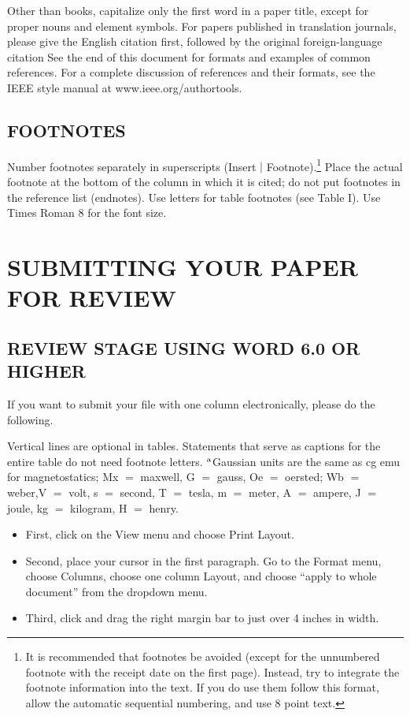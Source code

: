 \documentclass{IEEEojcsys}
\begin{document}
Other than books, capitalize only the first word in a paper title, except for proper nouns and element symbols. For papers published in translation journals, please give the English citation first, followed by the original foreign-language citation See the end of this document for formats and examples of common references. For a complete discussion of references and their formats, see the IEEE style manual at www.ieee.org/authortools.

\subsection{FOOTNOTES}

Number footnotes separately in superscripts (Insert $|$ Footnote).\footnote{It is recommended that footnotes be avoided (except for the unnumbered footnote with the receipt date on the first page). Instead, try to integrate the footnote information into the text. If  you  do  use  them  follow  this format, allow the automatic sequential numbering, and use 8 point text.}  Place the actual footnote at the bottom of the column in which it is cited; do not put footnotes in the reference list (endnotes). Use letters for table footnotes (see Table I). Use Times Roman 8 for the font size.

\section{SUBMITTING YOUR PAPER FOR REVIEW}

\subsection{REVIEW STAGE USING WORD 6.0 OR HIGHER}

If you want to submit your file with one column electronically, please do the following.


Vertical lines  are  optional  in  tables.  Statements  that serve as captions for the entire table do not need footnote letters. $^{\scriptsize\textrm a}$Gaussian   units   are   the   same   as   cg   emu   for magnetostatics; Mx $=$ maxwell, G $=$ gauss, Oe $=$ oersted; Wb $=$ weber,\break V $=$ volt, s $=$ second, T $=$ tesla, m $=$ meter, A $=$ ampere, J $=$ joule, kg $=$ kilogram, H $=$ henry.\vspace*{-5pt}

\begin{itemize}
\item[--\kern-4pt$$]First, click on the View menu and choose Print Layout.

\item[--\kern-4pt]Second, place your cursor in the first paragraph. Go to the Format menu, choose Columns, choose one column Layout, and choose ``apply to whole document'' from the dropdown menu.

\item[--\kern-4pt]Third, click and drag the right margin bar to just over 4 inches in width.
\end{itemize}\vspace*{-5pt}
\end{document}
